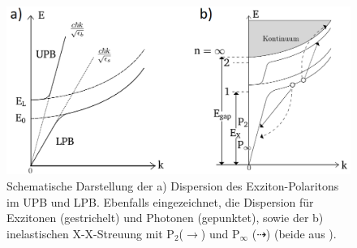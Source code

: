 \begin{figure}[htb]
\centering
\includegraphics[width=.6\textwidth]{Bilder/Vorbetrachtung/PolScat}
\caption[Polaritonendispersion und inelastische X-X-Streuung]{Schematische Darstellung der a) Dispersion des Exziton-Polaritons im UPB und LPB. Ebenfalls eingezeichnet, die Dispersion für Exzitonen (gestrichelt) und Photonen (gepunktet), sowie der b) inelastischen X-X-Streuung mit P$_\text{2}$($\longrightarrow$) und P$_\infty$ ($\dashrightarrow$) (beide aus \cite{Richters.Diss}).}
\label{PolScat}
\end{figure}
